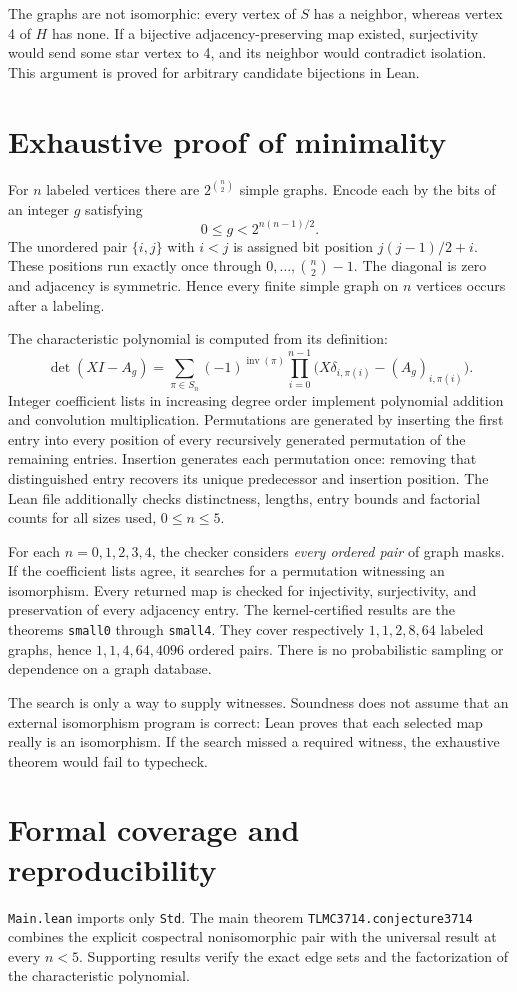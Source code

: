 \documentclass[10pt]{article}
\begin{document}
The graphs are not isomorphic: every vertex of $S$ has a neighbor, whereas vertex 4 of $H$ has none. If a bijective adjacency-preserving map existed, surjectivity would send some star vertex to 4, and its neighbor would contradict isolation. This argument is proved for arbitrary candidate bijections in Lean.
\section{Exhaustive proof of minimality}
For $n$ labeled vertices there are $2^{\binom n2}$ simple graphs. Encode each by the bits of an integer $g$ satisfying
\[
 0\le g<2^{n(n-1)/2}.
\]
The unordered pair $\{i,j\}$ with $i<j$ is assigned bit position $j(j-1)/2+i$. These positions run exactly once through $0,\ldots,\binom n2-1$. The diagonal is zero and adjacency is symmetric. Hence every finite simple graph on $n$ vertices occurs after a labeling.

The characteristic polynomial is computed from its definition:
\[
 \det(XI-A_g)=\sum_{\pi\in S_n}(-1)^{\operatorname{inv}(\pi)}
       \prod_{i=0}^{n-1}\bigl(X\delta_{i,\pi(i)}-(A_g)_{i,\pi(i)}\bigr).
\]
Integer coefficient lists in increasing degree order implement polynomial addition and convolution multiplication. Permutations are generated by inserting the first entry into every position of every recursively generated permutation of the remaining entries. Insertion generates each permutation once: removing that distinguished entry recovers its unique predecessor and insertion position. The Lean file additionally checks distinctness, lengths, entry bounds and factorial counts for all sizes used, $0\le n\le5$.

For each $n=0,1,2,3,4$, the checker considers \emph{every ordered pair} of graph masks. If the coefficient lists agree, it searches for a permutation witnessing an isomorphism. Every returned map is checked for injectivity, surjectivity, and preservation of every adjacency entry. The kernel-certified results are the theorems \texttt{small0} through \texttt{small4}. They cover respectively $1,1,2,8,64$ labeled graphs, hence $1,1,4,64,4096$ ordered pairs. There is no probabilistic sampling or dependence on a graph database.

The search is only a way to supply witnesses. Soundness does not assume that an external isomorphism program is correct: Lean proves that each selected map really is an isomorphism. If the search missed a required witness, the exhaustive theorem would fail to typecheck.
\section{Formal coverage and reproducibility}
\texttt{Main.lean} imports only \texttt{Std}. The main theorem \texttt{TLMC3714.conjecture3714} combines the explicit cospectral nonisomorphic pair with the universal result at every $n<5$. Supporting results verify the exact edge sets and the factorization of the characteristic polynomial.
\end{document}
